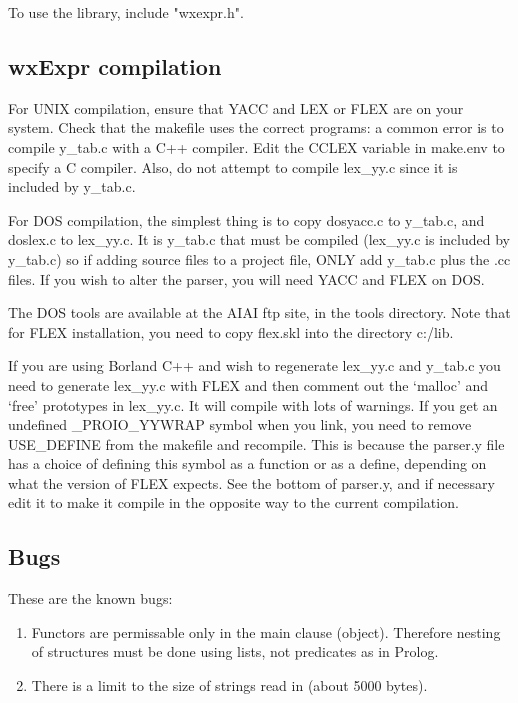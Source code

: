 To use the library, include "wxexpr.h".

\subsection{wxExpr compilation}

For UNIX compilation, ensure that YACC and LEX or FLEX are on your system. Check that
the makefile uses the correct programs: a common error is to compile
y\_tab.c with a C++ compiler. Edit the CCLEX variable in make.env
to specify a C compiler. Also, do not attempt to compile lex\_yy.c
since it is included by y\_tab.c.

For DOS compilation, the simplest thing is to copy dosyacc.c to y\_tab.c, and doslex.c to
lex\_yy.c. It is y\_tab.c that must be compiled (lex\_yy.c is included by
y\_tab.c) so if adding source files to a project file, ONLY add y\_tab.c
plus the .cc files. If you wish to alter the parser, you will need YACC
and FLEX on DOS.

The DOS tools are available at the AIAI ftp site, in the tools directory. Note that
for FLEX installation, you need to copy flex.skl into the directory
c:/lib.

If you are using Borland C++ and wish to regenerate lex\_yy.c and y\_tab.c
you need to generate lex\_yy.c with FLEX and then comment out the `malloc' and `free'
prototypes in lex\_yy.c. It will compile with lots of warnings. If you
get an undefined \_PROIO\_YYWRAP symbol when you link, you need to remove
USE\_DEFINE from the makefile and recompile. This is because the parser.y
file has a choice of defining this symbol as a function or as a define,
depending on what the version of FLEX expects. See the bottom of
parser.y, and if necessary edit it to make it compile in the opposite
way to the current compilation.


\subsection{Bugs}

These are the known bugs:

\begin{enumerate}\itemsep=0pt
\item Functors are permissable only in the main clause (object).
Therefore nesting of structures must be done using lists, not predicates
as in Prolog.
\item There is a limit to the size of strings read in (about 5000 bytes).
\end{enumerate}

